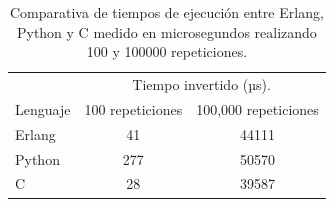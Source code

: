 \begin{table}[h]
\begin{center}
\sffamily
\begin{tabular}{lcc}
\toprule[1,7pt]
     &  \multicolumn{2}{c}{Tiempo invertido (µs).} \\
     \cline{2-3}
Lenguaje & 100 repeticiones & 100,000 repeticiones \\
\midrule[1.2pt]
Erlang & 41 & 44111 \\
\hline
Python & 277 & 50570 \\
\hline
C & 28 & 39587 \\
\bottomrule[1,7pt]
\end{tabular}
\caption[Comparativa de tiempos de ejecución]{Comparativa de tiempos de ejecución entre Erlang, Python y C medido en microsegundos realizando 100 y 100000 repeticiones.}%
\label{tab:tiempos1}
\end{center}
\end{table}







 